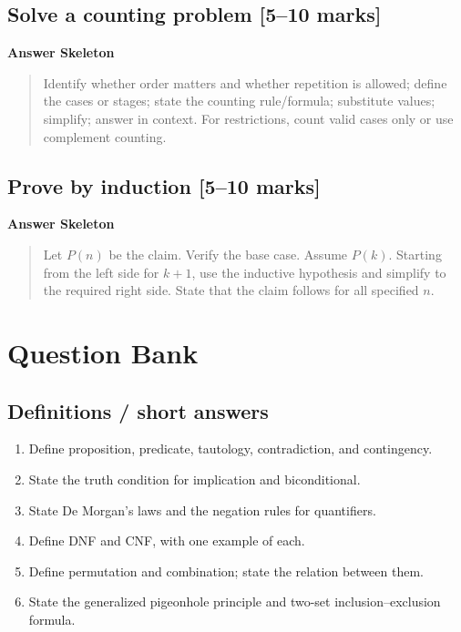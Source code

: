 \documentclass[11pt,a4paper]{article}
\newenvironment{answerbox}{\par\medskip\noindent\color{green}\textbf{Answer Skeleton}\par\smallskip\color{black}\begin{quote}}{\end{quote}\medskip}
\newcommand{\mkmarks}[1]{\hfill\textbf{[#1 marks]}}
\begin{document}
\subsection{Solve a counting problem \mkmarks{5--10}}
\begin{answerbox}Identify whether order matters and whether repetition is allowed; define the cases or stages; state the counting rule/formula; substitute values; simplify; answer in context. For restrictions, count valid cases only or use complement counting.\end{answerbox}

\subsection{Prove by induction \mkmarks{5--10}}
\begin{answerbox}Let $P(n)$ be the claim. Verify the base case. Assume $P(k)$. Starting from the left side for $k+1$, use the inductive hypothesis and simplify to the required right side. State that the claim follows for all specified $n$.\end{answerbox}

\section{Question Bank}
\subsection*{Definitions / short answers}
\begin{enumerate}
\item Define proposition, predicate, tautology, contradiction, and contingency.
\item State the truth condition for implication and biconditional.
\item State De Morgan's laws and the negation rules for quantifiers.
\item Define DNF and CNF, with one example of each.
\item Define permutation and combination; state the relation between them.
\item State the generalized pigeonhole principle and two-set inclusion--exclusion formula.
\end{enumerate}
\end{document}
